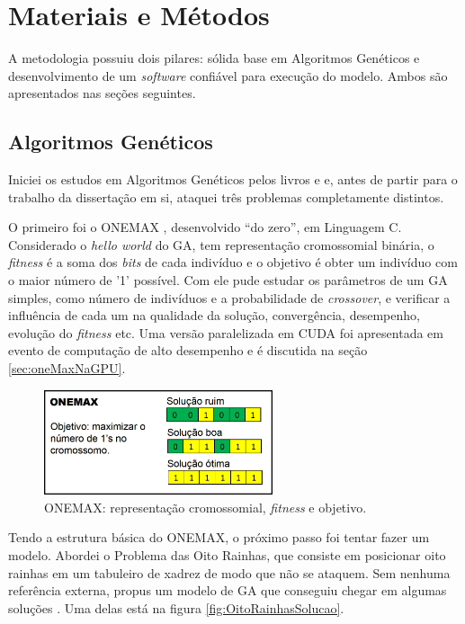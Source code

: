 \chapter{Materiais e Métodos\label{cap:metodologia}}

	A metodologia possuiu dois pilares: sólida base em Algoritmos Genéticos e desenvolvimento de um \emph{software} confiável para execução do modelo. Ambos são apresentados nas seções seguintes.

\section{Algoritmos Genéticos}\label{seq:medologia_ga}
	
	Iniciei os estudos em Algoritmos Genéticos pelos livros \cite{Mitchell98} e \cite{Linden2008} e, antes de partir para o trabalho da dissertação em si, ataquei três problemas completamente distintos.
	
	O primeiro foi o ONEMAX \cite{onemaxNaGPU}, desenvolvido ``do zero'', em Linguagem C. Considerado o \emph{hello world} do GA, tem representação cromossomial binária, o \emph{fitness} é a soma dos \emph{bits} de cada indivíduo e o objetivo é obter um indivíduo com o maior número de '1' possível. Com ele pude estudar os parâmetros de um GA simples, como número de indivíduos e a probabilidade de \emph{crossover}, e verificar a influência de cada um na qualidade da solução, convergência, desempenho, evolução do \emph{fitness} etc. Uma versão paralelizada em CUDA foi apresentada em evento de computação de alto desempenho \cite{ERAD12} e é discutida na seção \ref{sec:oneMaxNaGPU}.
	
	\begin{figure}[htbp]
		\centering
			\includegraphics[width=0.60\textwidth]{figs/resultados/onemax/onemax_objetivo.png}
		\caption{ONEMAX: representação cromossomial, \emph{fitness} e objetivo.}
		\label{fig:onemax_objetivo_metodologia}
	\end{figure}
	
	Tendo a estrutura básica do ONEMAX, o próximo passo foi tentar fazer um modelo. Abordei o Problema das Oito Rainhas, que consiste em posicionar oito rainhas em um tabuleiro de xadrez de modo que não se ataquem. Sem nenhuma referência externa, propus um modelo de GA que conseguiu chegar em algumas soluções \cite{qualificacao_adriano}. Uma delas está na figura \ref{fig:OitoRainhasSolucao}.
	
